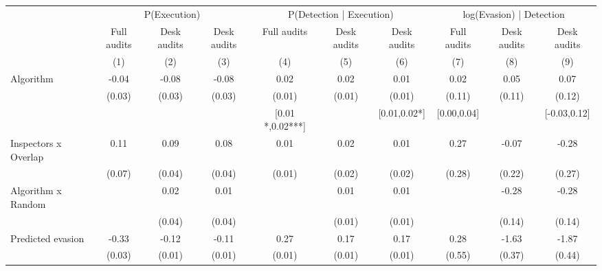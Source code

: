 \begin{tabular}{lccc|ccc|ccc} \toprule
\multicolumn{1}{l}{} & \multicolumn{3}{c}{P(Execution)} & \multicolumn{3}{c}{P(Detection | Execution)} & \multicolumn{3}{c}{log(Evasion) | Detection} \\\cmidrule(lr){2-4}\cmidrule(lr){5-7}\cmidrule(lr){8-10} \multicolumn{1}{l}{} & Full audits & Desk audits & Desk audits & Full audits & Desk audits & Desk audits & Full audits & Desk audits & Desk audits \\ \multicolumn{1}{l}{} & (1) & (2) & (3) & (4) & (5) & (6) & (7) & (8) & (9) \\ \midrule
Algorithm   &       -0.04         &       -0.08\sym{***}&       -0.08\sym{***}&        0.02\sym{**} &        0.02         &        0.01         &        0.02         &        0.05         &        0.07         \\
            &      (0.03)         &      (0.03)         &      (0.03)         &      (0.01)         &      (0.01)         &      (0.01)         &      (0.11)         &      (0.11)         &      (0.12)         \\
\addlinespace
 & & & & [0.01 *,0.02***] & & [0.01,0.02*] & [0.00,0.04] & & [-0.03,0.12] \\  Inspectors x Overlap&        0.11\sym{*}  &        0.09\sym{**} &        0.08\sym{**} &        0.01         &        0.02         &        0.01         &        0.27         &       -0.07         &       -0.28         \\
            &      (0.07)         &      (0.04)         &      (0.04)         &      (0.01)         &      (0.02)         &      (0.02)         &      (0.28)         &      (0.22)         &      (0.27)         \\
\addlinespace
Algorithm x Random&                     &        0.02         &        0.01         &                     &        0.01         &        0.01         &                     &       -0.28\sym{**} &       -0.28\sym{**} \\
            &                     &      (0.04)         &      (0.04)         &                     &      (0.01)         &      (0.01)         &                     &      (0.14)         &      (0.14)         \\
\addlinespace
Predicted evasion&       -0.33\sym{***}&       -0.12\sym{***}&       -0.11\sym{***}&        0.27\sym{***}&        0.17\sym{***}&        0.17\sym{***}&        0.28         &       -1.63\sym{***}&       -1.87\sym{***}\\
            &      (0.03)         &      (0.01)         &      (0.01)         &      (0.01)         &      (0.01)         &      (0.01)         &      (0.55)         &      (0.37)         &      (0.44)         \\

\end{tabular}
